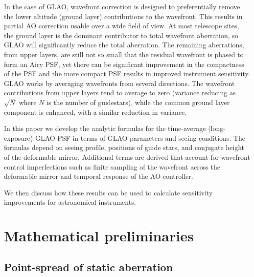 \documentclass[11pt, oneside]{article}   	%
\begin{document}
In the case of GLAO, wavefront correction is designed to preferentially remove the lower altitude (ground layer) contributions to the wavefront. This results in partial AO correction usable over a wide field of view. At most telescope sites, the ground layer is the dominant contributor to total wavefront aberration, so GLAO will significantly reduce the total aberration. The remaining aberrations, from upper layers, are still not so small that the residual wavefront is phased to form an Airy PSF, yet there can be significant improvement in the compactness of the PSF and the more compact PSF results in improved instrument sensitivity. GLAO works by averaging wavefronts from several directions.  The wavefront contributions from upper layers tend to average to zero (variance reducing as $\sqrt{N}$ where $N$ is the number of guidestars), while the common ground layer component is enhanced, with a similar reduction in variance.

In this paper we develop the analytic formulas for the time-average (long-exposure) GLAO PSF in terms of GLAO parameters and seeing conditions. The formulas depend on seeing profile, positions of guide stars, and conjugate height of the deformable mirror. Additional terms are derived that account for wavefront control imperfections such as finite sampling of the wavefront across the deformable mirror and temporal response of the AO controller.

We then discuss how these results can be used to calculate sensitivity improvements for astronomical instruments.

\section{Mathematical preliminaries}

\subsection{Point-spread of static aberration}
\end{document}
